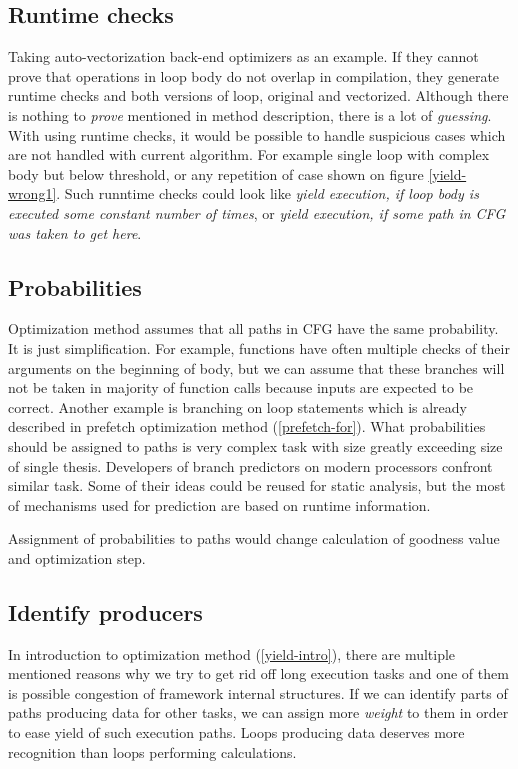 \subsection{Runtime checks}
Taking auto-vectorization back-end optimizers as an example. If they cannot prove that operations in loop body do not overlap in compilation, they generate runtime checks and both versions of loop, original and vectorized. Although there is nothing to \emph{prove} mentioned in method description, there is a lot of \emph{guessing}. With using runtime checks, it would be possible to handle suspicious cases which are not handled with current algorithm. For example single loop with complex body but below threshold, or any repetition of case shown on figure \ref{yield-wrong1}. Such runntime checks could look like \emph{yield execution, if loop body is executed some constant number of times}, or \emph{yield execution, if some path in CFG was taken to get here}.

\subsection{Probabilities}
Optimization method assumes that all paths in CFG have the same probability. It is just simplification. For example, functions have often multiple checks of their arguments on the beginning of body, but we can assume that these branches will not be taken in majority of function calls because inputs are expected to be correct. Another example is branching on loop statements which is already described in prefetch optimization method (\ref{prefetch-for}). What probabilities should be assigned to paths is very complex task with size greatly exceeding size of single thesis. Developers of branch predictors on modern processors confront similar task. Some of their ideas could be reused for static analysis, but the most of mechanisms used for prediction are based on runtime information.

Assignment of probabilities to paths would change calculation of goodness value and optimization step.

\subsection{Identify producers}
In introduction to optimization method (\ref{yield-intro}), there are multiple mentioned reasons why we try to get rid off long execution tasks and one of them is possible congestion of framework internal structures. If we can identify parts of paths producing data for other tasks, we can assign more \textit{weight} to them in order to ease yield of such execution paths. Loops producing data deserves more recognition than loops performing calculations.

